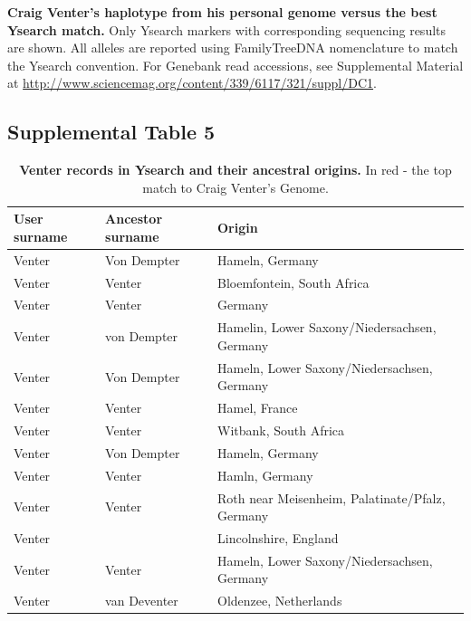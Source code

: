 \textbf{Craig Venter's haplotype from his personal genome versus the best Ysearch match.} Only Ysearch markers with corresponding sequencing results are shown. All alleles are reported using FamilyTreeDNA nomenclature to match the Ysearch convention. For Genebank read accessions, see Supplemental Material at \url{http://www.sciencemag.org/content/339/6117/321/suppl/DC1}.

\pagebreak
\subsection{Supplemental Table 5}
\begin{table}[h!]
\centering
\label{tab:sursuptab5}
\begin{adjustbox}{width=1\textwidth}
\begin{tabular}{l l l}
\hline
User surname & Ancestor surname & Origin \\
\hline
Venter & Von Dempter  & Hameln, Germany                                 \\
Venter & Venter       & Bloemfontein, South Africa                      \\
Venter & Venter       & Germany                                         \\
Venter & von Dempter  & Hamelin, Lower Saxony/Niedersachsen, Germany    \\
Venter & Von Dempter  & Hameln, Lower Saxony/Niedersachsen, Germany     \\
Venter & Venter       & Hamel, France                                   \\
Venter & Venter       & Witbank, South Africa                           \\
Venter & Von Dempter  & Hameln, Germany                                 \\
Venter & Venter       & Hamln, Germany                                  \\
Venter & Venter       & Roth near Meisenheim, Palatinate/Pfalz, Germany \\
Venter &              & Lincolnshire, England                           \\
Venter & Venter       & Hameln, Lower Saxony/Niedersachsen, Germany     \\
Venter & van Deventer & Oldenzee, Netherlands              \\
\hline
\end{tabular}
\end{adjustbox}
\caption{\textbf{Venter records in Ysearch and their ancestral origins.} In red - the top match to Craig Venter's Genome.}
\end{table}
